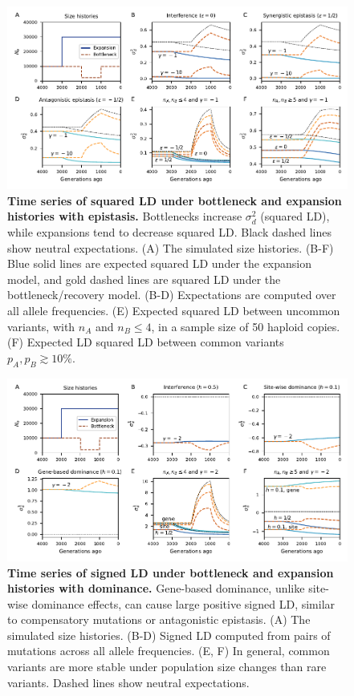 \documentclass[]{article}
\begin{document}
\begin{figure}[ht!]
    \centering
    \includegraphics{../figures/demog_bottle_expand.sd2}
    \caption{
        \textbf{Time series of squared LD under bottleneck 
        and expansion histories with epistasis.}
        Bottlenecks increase \(\sigma_d^2\) (squared LD),
        while expansions tend to decrease squared LD.
        Black dashed lines show neutral expectations.
        (A) The simulated size histories. (B-F) Blue solid lines
        are expected squared LD under the expansion model, and gold
        dashed lines are squared LD under the bottleneck/recovery model.
        (B-D) Expectations are computed over all allele frequencies.
        (E) Expected squared LD between uncommon variants, with $n_A$
        and $n_B \leq 4$, in a sample size of 50 haploid copies.
        (F) Expected LD squared LD between common variants
        $p_A, p_B \gtrsim 10\%$.
    }
    \label{fig:toy_sd2}
\end{figure}

\begin{figure}[ht!]
    \centering
    \includegraphics{../figures/demog_bottle_expand.dominance}
    \caption{
        \textbf{Time series of signed LD under bottleneck 
        and expansion histories with dominance.}
        Gene-based dominance, unlike site-wise dominance effects, can cause
        large positive signed LD, similar to compensatory mutations or
        antagonistic epistasis.
        (A) The simulated size histories.
        (B-D) Signed LD computed from pairs of mutations
        across all allele frequencies.
        (E, F) In general, common variants are more
        stable under population size changes than rare variants.
        Dashed lines show neutral expectations.
    }
    \label{fig:toy_dom}
\end{figure}
\end{document}
